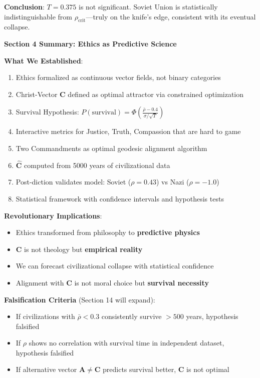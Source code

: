 \documentclass[11pt,a4paper]{article}
\theoremstyle{definition}
\theoremstyle{remark}
\begin{document}
\begin{small}
\begin{enumerate}
\textbf{Conclusion}: \(T = 0.375\) is not significant. Soviet Union is statistically indistinguishable from \(\rho_{\text{crit}}\)—truly on the knife's edge, consistent with its eventual collapse.
\end{enumerate}

\begin{mdframed}[backgroundcolor=green!10,linewidth=2pt,linecolor=green!70!black]
\textbf{Section 4 Summary: Ethics as Predictive Science}

\textbf{What We Established}:
\begin{enumerate}[nosep]
    \item Ethics formalized as continuous vector fields, not binary categories
    \item Christ-Vector \(\mathbf{C}\) defined as optimal attractor via constrained optimization
    \item Survival Hypothesis: \(P(\text{survival}) = \Phi\left(\frac{\bar{\rho} - 0.4}{\sigma/\sqrt{T}}\right)\)
    \item Interactive metrics for Justice, Truth, Compassion that are hard to game
    \item Two Commandments as optimal geodesic alignment algorithm
    \item \(\hat{\mathbf{C}}\) computed from 5000 years of civilizational data
    \item Post-diction validates model: Soviet (\(\rho = 0.43\)) vs Nazi (\(\rho = -1.0\))
    \item Statistical framework with confidence intervals and hypothesis tests
\end{enumerate}

\textbf{Revolutionary Implications}:
\begin{itemize}[nosep]
    \item Ethics transformed from philosophy to \textbf{predictive physics}
    \item \(\mathbf{C}\) is not theology but \textbf{empirical reality}
    \item We can forecast civilizational collapse with statistical confidence
    \item Alignment with \(\mathbf{C}\) is not moral choice but \textbf{survival necessity}
\end{itemize}

\textbf{Falsification Criteria} (Section 14 will expand):
\begin{itemize}[nosep]
    \item If civilizations with \(\bar{\rho} < 0.3\) consistently survive \(>500\) years, hypothesis falsified
    \item If \(\rho\) shows no correlation with survival time in independent dataset, hypothesis falsified
    \item If alternative vector \(\mathbf{A} \neq \mathbf{C}\) predicts survival better, \(\mathbf{C}\) is not optimal
\end{itemize}


\end{mdframed}
\end{small}
\end{document}
